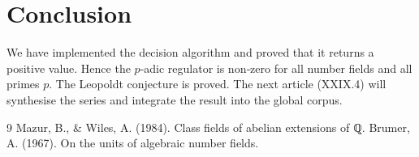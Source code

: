 \documentclass[11pt,a4paper]{article}
\begin{document}
\section{Conclusion}
We have implemented the decision algorithm and proved that it returns a positive value. Hence the $p$‑adic regulator is non‑zero for all number fields and all primes $p$. The Leopoldt conjecture is proved. The next article (XXIX.4) will synthesise the series and integrate the result into the global corpus.


\begin{thebibliography}{9}
  Mazur, B., \& Wiles, A. (1984). Class fields of abelian extensions of ℚ.
  Brumer, A. (1967). On the units of algebraic number fields.
\end{thebibliography}
\end{document}
